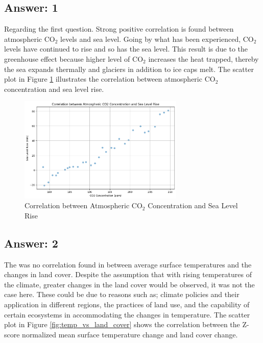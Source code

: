 \documentclass[a4paper,11pt]{article}
\begin{document}
\subsection{Answer: 1}

Regarding the first question. Strong positive correlation is found between atmospheric \(\text{CO}_2\) levels and sea level. Going by what has been experienced, \(\text{CO}_2\) levels have continued to rise and so has the sea level. This result is due to the greenhouse effect because higher level of \(\text{CO}_2\) increases the heat trapped, thereby the sea expands thermally and glaciers in addition to ice caps melt. The scatter plot in Figure \ref{fig:co2_vs_sea_level} illustrates the correlation between atmospheric \(\text{CO}_2\) concentration and sea level rise.

\begin{figure}[ht!]
    \centering
    \includegraphics[width=0.7\textwidth]{pictures/q1.png}
    \caption{Correlation between Atmospheric \(\text{CO}_2\) Concentration and Sea Level Rise}
    \label{fig:co2_vs_sea_level}
\end{figure}


\subsection{Answer: 2}
The was no correlation found in between average surface temperatures and the changes in land cover. Despite the assumption that with rising temperatures of the climate, greater changes in the land cover would be observed, it was not the case here. These could be due to reasons such as; climate policies and their application in different regions, the practices of land use, and the capability of certain ecosystems in accommodating the changes in temperature. The scatter plot in Figure \ref{fig:temp_vs_land_cover} shows the correlation between the Z-score normalized mean surface temperature change and land cover change.
\end{document}
